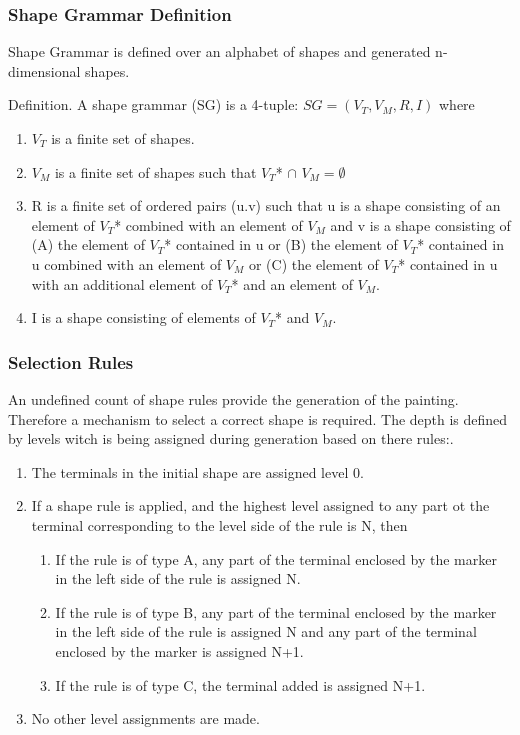\documentclass[11pt, a4paper]{report}
\begin{document}
\subsubsection{Shape Grammar Definition}
\label{sec:Shape_Grammar_Definition}
Shape Grammar is defined over an alphabet of shapes and generated n-dimensional shapes\citep{shapeGrammars:1972}.
\begin{displayquote} 
    Definition. A shape grammar (SG) is a 4-tuple: $SG = (V_T, V_M, R, I)$ where
    \begin{enumerate}
        \item $V_T$ is a finite set of shapes.
        \item $V_M$ is a finite set of shapes such that $V_T $* $\cap$  $V_M = \emptyset$
        \item R is a finite set of ordered pairs (u.v) such that u is a shape consisting of an element of $V_T $* combined with an element of $V_M$ and v is a shape consisting of (A) the element of $V_T $* contained in u or (B) the element of $V_T $* contained in u combined with an element of $V_M$ or (C) the element of $V_T $* contained in u with an additional element of $V_T$* and an element of $V_M$.
        \item I is a shape consisting of elements of $V_T $* and $V_M$.
    \end{enumerate}
\end{displayquote}

\subsubsection{Selection Rules}
\label{sec:Shape_Grammar_Selection_Rules}
An undefined count of shape rules provide the generation of the painting. Therefore a mechanism to select a correct shape is required. The depth is defined by levels witch is being assigned during generation based on there rules:\citep{shapeGrammars:1972}.
\begin{displayquote}
    \begin{enumerate}
        \item The terminals in the initial shape are assigned level 0.
        \item If a shape rule is applied, and the highest level assigned to any part ot the terminal corresponding to the level side of the rule is N, then
        \begin{enumerate}
            \item If the rule is of type A, any part of the terminal enclosed by the marker in the left side of the rule is assigned N.
            \item If the rule is of type B, any part of the terminal enclosed by the marker in the left side of the rule is assigned N and any part of the terminal enclosed by the marker is assigned N+1.
            \item If the rule is of type C, the terminal added is assigned N+1.
        \end{enumerate}
        \item No other level assignments are made.
    \end{enumerate}
\end{displayquote}
\end{document}
